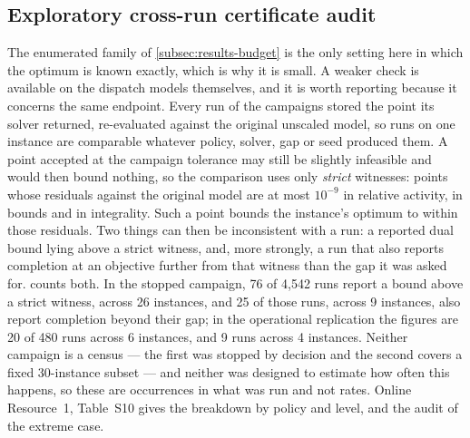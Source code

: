 \documentclass[smallextended,envcountsect,envcountsame]{svjour3}
\begin{document}
\subsection{Exploratory cross-run certificate audit}
\label{subsec:results-certificates}
The enumerated family of \cref{subsec:results-budget} is the only setting here in which the
optimum is known exactly, which is why it is small. A weaker check is available on the dispatch
models themselves, and it is worth reporting because it concerns the same endpoint. Every run of
the campaigns stored the point its solver returned, re-evaluated against the original unscaled
model, so runs on one instance are comparable whatever policy, solver, gap or seed produced
them. A point accepted at the campaign tolerance may still be slightly infeasible and would
then bound nothing, so the comparison uses only \emph{strict} witnesses: points whose residuals
against the original model are at most $10^{-9}$ in relative activity, in bounds and in
integrality. Such a point bounds the instance's optimum to within those residuals. Two things
can then be inconsistent with a run: a reported dual bound lying above a strict witness, and,
more strongly, a run that also reports completion at an objective further from that witness
than the gap it was asked for.  counts both. In the stopped
campaign, 76 of 4,542 runs report a bound above a strict witness, across 26 instances, and 25
of those runs, across 9 instances, also report completion beyond their gap; in the operational
replication the figures are 20 of 480 runs across 6 instances, and 9 runs across 4 instances.
Neither campaign is a census --- the first was stopped by decision and the second covers a
fixed 30-instance subset --- and neither was designed to estimate how often this happens, so
these are occurrences in what was run and not rates. Online Resource~1, Table~S10 gives the
breakdown by policy and level, and the audit of the extreme case.
\end{document}
